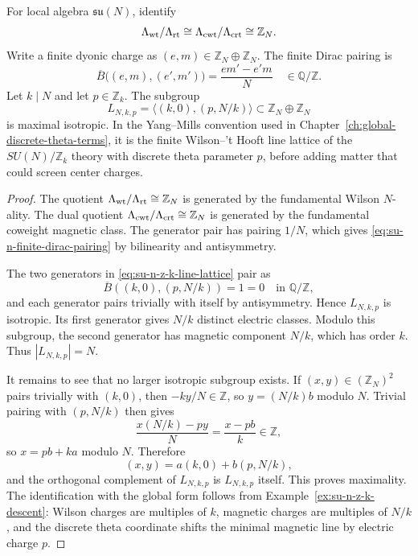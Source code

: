 \begin{proposition}
\label{prop:su-n-finite-line-lattices}
For local algebra \(\mathfrak{su}(N)\), identify
\[
  \Lambda_{\rm wt}/\Lambda_{\rm rt}
  \cong
  \Lambda_{\rm cwt}/\Lambda_{\rm crt}
  \cong
  \mathbb Z_N.
\]
Write a finite dyonic charge as \((e,m)\in\mathbb Z_N\oplus\mathbb Z_N\).
The finite Dirac pairing is
\begin{equation}
  \overline B\bigl((e,m),(e',m')\bigr)
  =
  \frac{em'-e'm}{N}
  \quad\in\mathbb Q/\mathbb Z .
  \label{eq:su-n-finite-dirac-pairing}
\end{equation}
Let \(k\mid N\) and let \(p\in\mathbb Z_k\).  The subgroup
\begin{equation}
  L_{N,k,p}
  =
  \bigl\langle (k,0),(p,N/k)\bigr\rangle
  \subset \mathbb Z_N\oplus\mathbb Z_N
  \label{eq:su-n-z-k-line-lattice}
\end{equation}
is maximal isotropic.  In the Yang--Mills convention used in
Chapter~\ref{ch:global-discrete-theta-terms}, it is the finite
Wilson--'t Hooft line lattice of the \(SU(N)/\mathbb Z_k\) theory with
discrete theta parameter \(p\), before adding matter that could screen
center charges.
\end{proposition}

\begin{proof}
The quotient
\(\Lambda_{\rm wt}/\Lambda_{\rm rt}\cong\mathbb Z_N\) is generated by the
fundamental Wilson \(N\)-ality.  The dual quotient
\(\Lambda_{\rm cwt}/\Lambda_{\rm crt}\cong\mathbb Z_N\) is generated by the
fundamental coweight magnetic class.  The generator pair has pairing
\(1/N\), which gives \eqref{eq:su-n-finite-dirac-pairing} by bilinearity and
antisymmetry.

The two generators in \eqref{eq:su-n-z-k-line-lattice} pair as
\[
  \overline B((k,0),(p,N/k))=1=0\quad\text{in }\mathbb Q/\mathbb Z,
\]
and each generator pairs trivially with itself by antisymmetry.  Hence
\(L_{N,k,p}\) is isotropic.  Its first generator gives \(N/k\) distinct
electric classes.  Modulo this subgroup, the second generator has magnetic
component \(N/k\), which has order \(k\).  Thus \(|L_{N,k,p}|=N\).

It remains to see that no larger isotropic subgroup exists.  If
\((x,y)\in(\mathbb Z_N)^2\) pairs trivially with \((k,0)\), then
\(-ky/N\in\mathbb Z\), so \(y=(N/k)b\) modulo \(N\).  Trivial pairing with
\((p,N/k)\) then gives
\[
  \frac{x(N/k)-py}{N}
  =
  \frac{x-pb}{k}
  \in\mathbb Z,
\]
so \(x=pb+ka\) modulo \(N\).  Therefore
\[
  (x,y)=a(k,0)+b(p,N/k),
\]
and the orthogonal complement of \(L_{N,k,p}\) is \(L_{N,k,p}\) itself.
This proves maximality.  The identification with the global form follows
from Example~\ref{ex:su-n-z-k-descent}: Wilson charges are multiples of
\(k\), magnetic charges are multiples of \(N/k\), and the discrete theta
coordinate shifts the minimal magnetic line by electric charge \(p\).
\end{proof}

